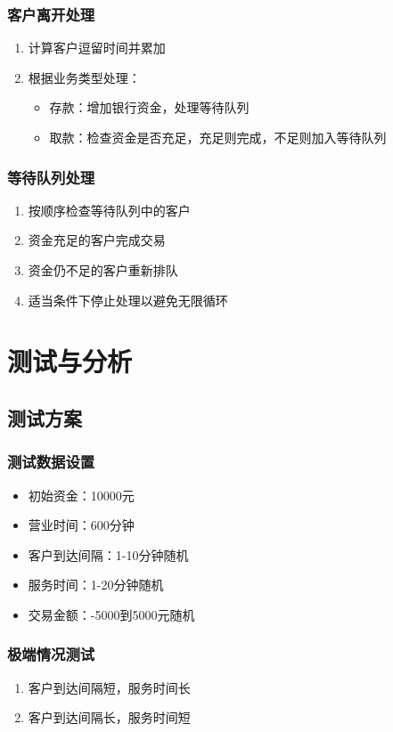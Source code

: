 \documentclass[12pt,a4paper]{article}
\begin{document}
\subsubsection{客户离开处理}
\begin{enumerate}
\item 计算客户逗留时间并累加
\item 根据业务类型处理：
  \begin{itemize}
  \item 存款：增加银行资金，处理等待队列
  \item 取款：检查资金是否充足，充足则完成，不足则加入等待队列
  \end{itemize}
\end{enumerate}

\subsubsection{等待队列处理}
\begin{enumerate}
\item 按顺序检查等待队列中的客户
\item 资金充足的客户完成交易
\item 资金仍不足的客户重新排队
\item 适当条件下停止处理以避免无限循环
\end{enumerate}

\section{测试与分析}
\subsection{测试方案}
\subsubsection{测试数据设置}
\begin{itemize}
\item 初始资金：10000元
\item 营业时间：600分钟
\item 客户到达间隔：1-10分钟随机
\item 服务时间：1-20分钟随机
\item 交易金额：-5000到5000元随机
\end{itemize}

\subsubsection{极端情况测试}
\begin{enumerate}
\item 客户到达间隔短，服务时间长
\item 客户到达间隔长，服务时间短
\end{enumerate}
\end{document}
